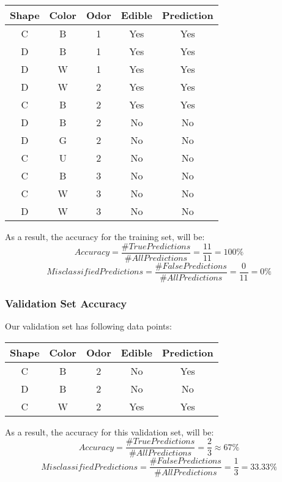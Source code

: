 \documentclass{article}
\begin{document}
\begin{tabular}{|c|c|c|c|c|}
  \hline
    \textbf{Shape} & \textbf{Color} & \textbf{Odor} & \textbf{Edible} & \textbf{Prediction} \\
  \hline
    C & B & 1 & Yes & Yes \\
  \hline
    D & B & 1 & Yes & Yes \\
  \hline
    D & W & 1 & Yes & Yes \\
  \hline
    D & W & 2 & Yes & Yes \\
  \hline
    C & B & 2 & Yes & Yes \\
  \hline
    D & B & 2 & No & No \\
  \hline
    D & G & 2 & No & No \\
  \hline
    C & U & 2 & No & No \\
  \hline
    C & B & 3 & No & No \\
  \hline
    C & W & 3 & No & No \\
  \hline
    D & W & 3 & No & No \\
  \hline
\end{tabular}

\bigskip

As a result, the accuracy for the training set, will be:\\ $$Accuracy = \frac{\# True Predictions}{\# All Predictions} = \frac{11}{11} = 100\% $$
$$Misclassified Predictions = \frac{\# False Predictions}{\# All Predictions} = \frac{0}{11} = 0\%$$

\bigskip
\bigskip

\subsubsection{Validation Set Accuracy}
Our validation set has following data points:\\

\begin{tabular}{|c|c|c|c|c|}
  \hline
    \textbf{Shape} & \textbf{Color} & \textbf{Odor} & \textbf{Edible} & \textbf{Prediction} \\
  \hline
    C & B & 2 & No & Yes\\
  \hline
    D & B & 2 & No & No \\
  \hline
    C & W & 2 & Yes & Yes \\
  \hline
\end{tabular}

\bigskip

As a result, the accuracy for this validation set, will be:\\ $$Accuracy = \frac{\# True Predictions}{\# All Predictions} = \frac{2}{3} \approx 67\% $$
$$Misclassified Predictions = \frac{\# False Predictions}{\# All Predictions} = \frac{1}{3} = 33.33\%$$
\end{document}

